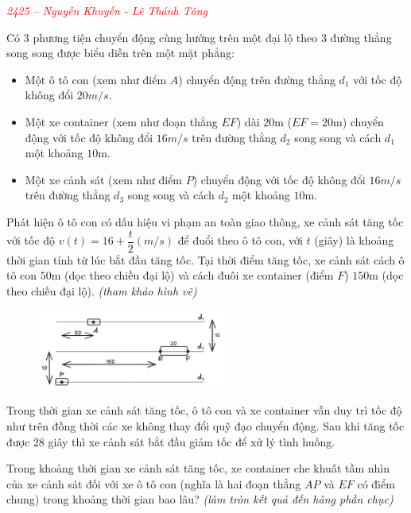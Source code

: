\documentclass[twoside,final]{hcmut-report}
\newcommand{\exercise}[1]{\begin{exercisebox}#1\end{exercisebox}}
\begin{document}
\exercise{
    \textcolor{red}{\textit{2425 -- Nguyễn Khuyến - Lê Thánh Tông}}

    Có 3 phương tiện chuyển động cùng hướng trên một đại lộ theo 3 đường thẳng song song được biểu diễn trên một mặt phẳng:
    \begin{itemize}[itemsep=0pt, topsep=0pt, parsep=0pt,label=--]
        \item Một ô tô con (xem như điểm $A$) chuyển động trên đường thẳng $d_1$ với tốc độ không đổi $20m/s$.
        \item Một xe container (xem như đoạn thẳng $EF$) dài $20$m ($EF=20$m) chuyển động với tốc độ không đổi $16m/s$ trên đường thẳng $d_2$ song song và cách $d_1$ một khoảng $10$m.
        \item Một xe cảnh sát (xem như điểm $P$) chuyển động với tốc độ không đổi $16m/s$ trên đường thẳng $d_3$ song song và cách $d_2$ một khoảng $10$m.
    \end{itemize}

    Phát hiện ô tô con có dấu hiệu vi phạm an toàn giao thông, xe cảnh sát tăng tốc với tốc độ $v(t) = 16 + \dfrac{t}{2} (m/s)$ để đuổi theo ô tô con, với $t$ (giây) là khoảng thời gian tính từ lúc bắt đầu tăng tốc. Tại thời điểm tăng tốc, xe cảnh sát cách ô tô con $50$m (dọc theo chiều đại lộ) và cách đuôi xe container (điểm $F$) $150$m (dọc theo chiều đại lộ). \textit{(tham khảo hình vẽ)}

    \begin{figure}[H]
        \centering
        \includegraphics*[width=0.55\textwidth]{images/Toán rời rạc/NK.png}
    \end{figure}

    Trong thời gian xe cảnh sát tăng tốc, ô tô con và xe container vẫn duy trì tốc độ như trên đồng thời các xe không thay đổi quỹ đạo chuyển động. Sau khi tăng tốc được $28$ giây thì xe cảnh sát bắt đầu giảm tốc để xử lý tình huống.

    Trong khoảng thời gian xe cảnh sát tăng tốc, xe container che khuất tầm nhìn của xe cảnh sát đối với xe ô tô con (nghĩa là hai đoạn thẳng $AP$ và $EF$ có điểm chung) trong khoảng thời gian bao lâu? \textit{(làm tròn kết quả đến hàng phần chục)}
}
\end{document}
